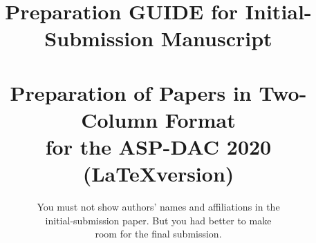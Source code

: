 \def\section{\@startsection {section}{1}{\z@}{20pt plus 2pt minus 2pt}
{8pt plus 2pt minus 2pt}{\centering\normalsize\sc
\edef\@svsec{\thesection.\ }}}
\def\thesection{\Roman{section}}

\def\subsection{\@startsection {subsection}{2}{\z@}{16pt plus 2pt minus 2pt}
{6pt plus 2pt minus 2pt}{\normalsize\sl
\edef\@svsec{\thesubsection.\ }}}
\def\thesubsection{\Alph{subsection}}

\long{}
\def\fnum@figure{\raggedright{\footnotesize Fig. \thefigure }.%
\footnotesize}
\def\fnum@table{\footnotesize TABLE \thetable\\\footnotesize\sc}
\def\thetable{\Roman{table}}

\makeatother



\date{}

\title{\Large\bf
Preparation GUIDE for Initial-Submission Manuscript\\~\\
\large\bf
Preparation of Papers in Two-Column Format\\
for the ASP-DAC 2020 (\LaTeX version)}


\author{
You must not show authors' names and affiliations in the\\
initial-submission paper. But you had better to make \\
room for the final submission.\\
\\
\\
\\ %
}
\maketitle
\thispagestyle{empty}


